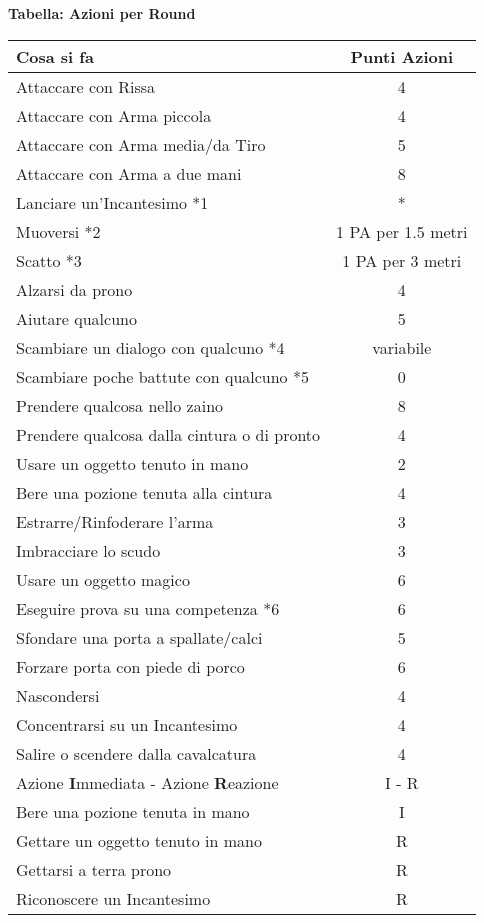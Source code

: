\documentclass[12pt,a4paper,twoside,openany]{book}
\begin{document}
\textbf{Tabella: Azioni per Round}



\begin{tabularx}{0.95\textwidth}{Xc}
\textbf{Cosa si fa}  & \textbf{Punti Azioni}\\
\toprule
Attaccare con Rissa					& 4\\
Attaccare con Arma piccola			& 4\\
Attaccare con Arma media/da Tiro	& 5\\
Attaccare con Arma a due mani		& 8\\
Lanciare un'Incantesimo *1			& *\\
Muoversi *2							& 1 PA per 1.5 metri\\
Scatto *3							& 1 PA per 3 metri\\
Alzarsi da prono					& 4\\
Aiutare qualcuno					& 5\\
Scambiare un dialogo con qualcuno *4	& variabile\\
Scambiare poche battute con qualcuno *5& 0\\
Prendere qualcosa nello zaino		& 8\\
Prendere qualcosa dalla cintura o di pronto & 4\\
Usare un oggetto tenuto in mano		& 2\\
Bere una pozione tenuta alla cintura& 4\\
Estrarre/Rinfoderare l'arma			& 3\\
Imbracciare lo scudo				& 3\\
Usare un oggetto magico				& 6\\
Eseguire prova su una competenza *6	& 6\\
Sfondare una porta a spallate/calci	& 5\\
Forzare porta con piede di porco	& 6\\
Nascondersi							& 4\\
Concentrarsi su un Incantesimo		& 4\\
Salire o scendere dalla cavalcatura	& 4\\
Azione \textbf{I}mmediata - Azione \textbf{R}eazione& I - R\\
Bere una pozione tenuta in mano& I\\
Gettare un oggetto tenuto in mano& R\\
Gettarsi a terra prono& R\\
Riconoscere un Incantesimo& R\\
\end{tabularx}
\end{document}
